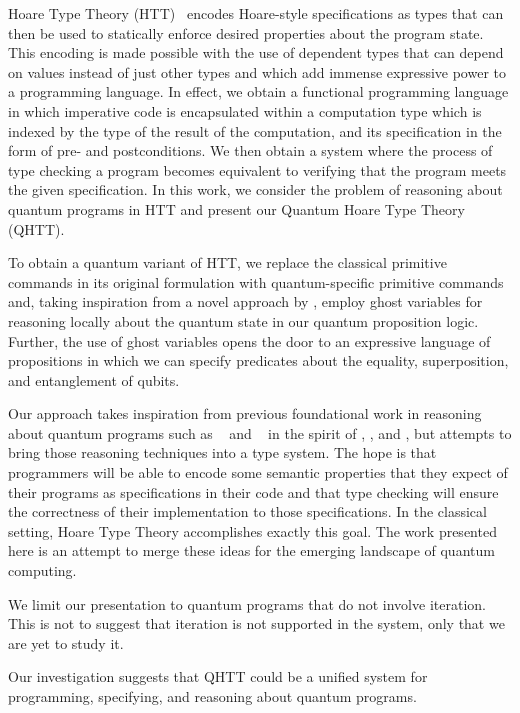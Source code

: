 Hoare Type Theory (HTT)~\parencite{nanevski2008} encodes Hoare-style specifications as types that can then be used to statically enforce desired properties about the program state. This encoding is made possible with the use of dependent types that can depend on values instead of just other types and which add immense expressive power to a programming language. In effect, we obtain a functional programming language in which imperative code is encapsulated within a computation type which is indexed by the type of the result of the computation, and its specification in the form of pre- and postconditions. We then obtain a system where the process of type checking a program becomes equivalent to verifying that the program meets the given specification. In this work, we consider the problem of reasoning about quantum programs in HTT and present our Quantum Hoare Type Theory (QHTT).

To obtain a quantum variant of HTT, we replace the classical primitive commands in its original formulation with quantum-specific primitive commands and, taking inspiration from a novel approach by \textcite{unruh2019}, employ ghost variables for reasoning locally about the quantum state in our quantum proposition logic. Further, the use of ghost variables opens the door to an expressive language of propositions in which we can specify predicates about the equality, superposition, and entanglement of qubits.

Our approach takes inspiration from previous foundational work in reasoning about quantum programs such as ~\parencite{dhondt2006} and ~\parencite{floydhoare2012} in the spirit of \textcite{hoare1969}, \textcite{dijkstra1976}, and \textcite{gries1981}, but attempts to bring those reasoning techniques into a type system. The hope is that programmers will be able to encode some semantic properties that they expect of their programs as specifications in their code and that type checking will ensure the correctness of their implementation to those specifications. In the classical setting, Hoare Type Theory accomplishes exactly this goal. The work presented here is an attempt to merge these ideas for the emerging landscape of quantum computing.

We limit our presentation to quantum programs that do not involve iteration. This is not to suggest that iteration is not supported in the system, only that we are yet to study it.

Our investigation suggests that QHTT could be a unified system for programming, specifying, and reasoning about quantum programs.

